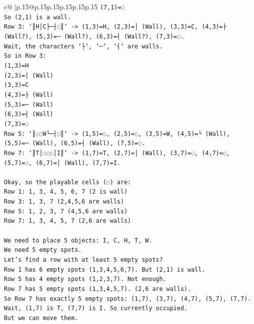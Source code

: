 \documentclass{article}
\begin{document}
{\begin{supertabular}{c@{$\;$}|p{.15\linewidth}@{}p{.15\linewidth}p{.15\linewidth}p{.15\linewidth}p{.15\linewidth}p{.15\linewidth}}
{{{\texttt{(7,1)=◌} \\
\texttt{So (2,1) is a wall.} \\
\texttt{Row 3: `║H│C├─┤◌║` {-}> (1,3)=H, (2,3)=│ (Wall), (3,3)=C, (4,3)=├ (Wall?), (5,3)=─ (Wall?), (6,3)=┤ (Wall?), (7,3)=◌.} \\
\texttt{Wait, the characters `├`, `─`, `┤` are walls.} \\
\texttt{So in Row 3:} \\
\texttt{(1,3)=H} \\
\texttt{(2,3)=│ (Wall)} \\
\texttt{(3,3)=C} \\
\texttt{(4,3)=├ (Wall)} \\
\texttt{(5,3)=─ (Wall)} \\
\texttt{(6,3)=┤ (Wall)} \\
\texttt{(7,3)=◌} \\
\texttt{Row 5: `║◌◌W└─┤◌║` {-}> (1,5)=◌, (2,5)=◌, (3,5)=W, (4,5)=└ (Wall), (5,5)=─ (Wall), (6,5)=┤ (Wall), (7,5)=◌.} \\
\texttt{Row 7: `║T│◌◌◌│I║` {-}> (1,7)=T, (2,7)=│ (Wall), (3,7)=◌, (4,7)=◌, (5,7)=◌, (6,7)=│ (Wall), (7,7)=I.} \\
\\ 
\texttt{Okay, so the playable cells (◌) are:} \\
\texttt{Row 1: 1, 3, 4, 5, 6, 7 (2 is wall)} \\
\texttt{Row 3: 1, 3, 7 (2,4,5,6 are walls)} \\
\texttt{Row 5: 1, 2, 3, 7 (4,5,6 are walls)} \\
\texttt{Row 7: 1, 3, 4, 5, 7 (2,6 are walls)} \\
\\ 
\texttt{We need to place 5 objects: I, C, H, T, W.} \\
\texttt{We need 5 empty spots.} \\
\texttt{Let's find a row with at least 5 empty spots?} \\
\texttt{Row 1 has 6 empty spots (1,3,4,5,6,7). But (2,1) is wall.} \\
\texttt{Row 5 has 4 empty spots (1,2,3,7). Not enough.} \\
\texttt{Row 7 has 5 empty spots (1,3,4,5,7). (2,6 are walls).} \\
\texttt{So Row 7 has exactly 5 empty spots: (1,7), (3,7), (4,7), (5,7), (7,7).} \\
\texttt{Wait, (1,7) is T, (7,7) is I. So currently occupied.} \\
\texttt{But we can move them.} \\
}}}
\end{supertabular}}
\end{document}
